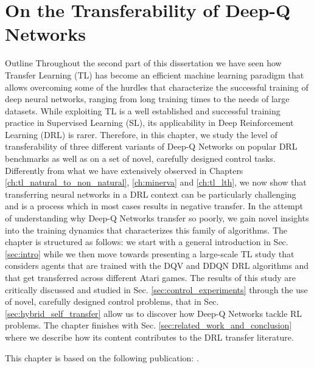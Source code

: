 
\chapter{On the Transferability of Deep-Q Networks} %
\label{ch:dqn_transfer} %

\begin{remark}{Outline}
	Throughout the second part of this dissertation we have seen how Transfer Learning (TL) has become an efficient machine learning paradigm that allows overcoming some of the hurdles that characterize the successful training of deep neural networks, ranging from long training times to the needs of large datasets. While exploiting TL is a well established and successful training practice in Supervised Learning (SL), its applicability in Deep Reinforcement Learning (DRL) is rarer. Therefore, in this chapter, we study the level of transferability of three different variants of Deep-Q Networks on popular DRL benchmarks as well as on a set of novel, carefully designed control tasks. Differently from what we have extensively observed in Chapters \ref{ch:tl_natural_to_non_natural}, \ref{ch:minerva} and \ref{ch:tl_lth}, we now show that transferring neural networks in a DRL context can be particularly challenging and is a process which in most cases results in negative transfer. In the attempt of understanding why Deep-Q Networks transfer so poorly, we gain novel insights into the training dynamics that characterizes this family of algorithms. The chapter is structured as follows: we start with a general introduction in Sec. \ref{sec:intro} while we then move towards presenting a large-scale TL study that considers agents that are trained with the DQV and DDQN DRL algorithms and that get transferred across different Atari games. The results of this study are critically discussed and studied in Sec. \ref{sec:control_experiments} through the use of novel, carefully designed control problems, that in Sec. \ref{sec:hybrid_self_transfer} allow us to discover how Deep-Q Networks tackle RL problems. The chapter finishes with Sec. \ref{sec:related_work_and_conclusion} where we describe how its content contributes to the DRL transfer literature.

	This chapter is based on the following publication: \citet{sabatelli2021transferability}.

\end{remark}


